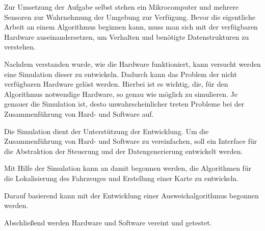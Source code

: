 Zur Umsetzung der Aufgabe selbst stehen ein Mikrocomputer und mehrere Sensoren zur Wahrnehmung der Umgebung zur Verfügung.
Bevor die eigentliche Arbeit an einem Algorithmus beginnen kann, muss man sich mit der verfügbaren Hardware auseinandersetzen,
um Verhalten und benötigte Datenstrukturen zu verstehen.

Nachdem verstanden wurde, wie die Hardware funktioniert, kann versucht werden eine Simulation dieser zu entwickeln.
Dadurch kann das Problem der nicht verfügbaren Hardware gelöst werden.
Hierbei ist es wichtig, die, für den Algorithmus notwendige Hardware, so genau wie möglich zu simulieren. 
Je genauer die Simulation ist, desto unwahrscheinlicher treten Probleme bei der Zusammenführung von Hard- und Software auf.

Die Simulation dient der Unterstützung der Entwicklung.
Um die Zusammenführung von Hard- und Software zu vereinfachen, soll ein Interface für die Abstraktion der Steuerung und der Datengenerierung entwickelt werden. 

Mit Hilfe der Simulation kann an damit begonnen werden, die Algorithmen für die Lokalisierung des Fahrzeuges und Erstellung einer Karte zu entwickeln.

Darauf basierend kann mit der Entwicklung einer Ausweichalgorithmus begonnen werden.

Abschließend werden Hardware und Software vereint und getestet.

\newpage

